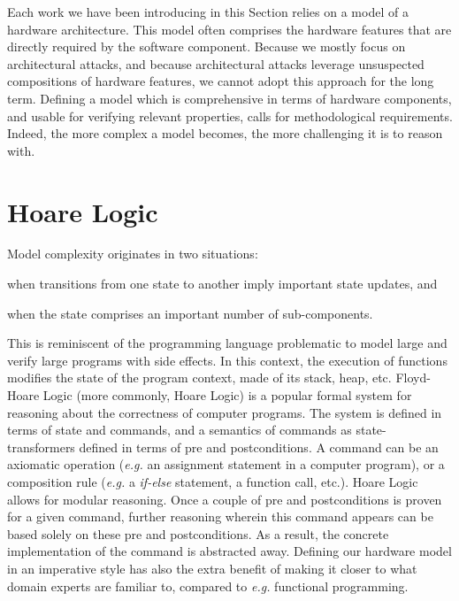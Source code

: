 Each work we have been introducing in this Section relies on a model of a
hardware architecture.
%
This model often comprises the hardware features that are directly required by
the software component.
%
Because we mostly focus on architectural attacks, and because architectural
attacks leverage unsuspected compositions of hardware features, we cannot adopt
this approach for the long term.
%
Defining a model which is comprehensive in terms of hardware components, and
usable for verifying relevant properties, calls for methodological requirements.
%
Indeed, the more complex a model becomes, the more challenging it is to reason
with.

\section{Hoare Logic} %
\label{sec:related:hoare}

Model complexity originates in two situations:
%
\begin{inparaenum}[(1)]
\item when transitions from one state to another imply important state updates,
  and
%
\item when the state comprises an important number of sub-components.
%
\end{inparaenum}
%
This is reminiscent of the programming language problematic to model large and
verify large programs with side effects.
%
In this context, the execution of functions modifies the state of the program
context, made of its stack, heap, etc.
%
Floyd-Hoare Logic (more commonly, Hoare Logic) is a popular formal system for
reasoning about the correctness of computer programs.
%
The system is defined in terms of state and commands, and a semantics of
commands as state-transformers defined in terms of pre and postconditions.
%
A command can be an axiomatic operation (\emph{e.g.} an assignment statement in
a computer program), or a composition rule (\emph{e.g.} a \emph{if-else}
statement, a function call, etc.).
%
Hoare Logic allows for modular reasoning.
%
Once a couple of pre and postconditions is proven for a given command, further
reasoning wherein this command appears can be based solely on these pre and postconditions.
%
As a result, the concrete implementation of the command is abstracted away.
%
Defining our hardware model in an imperative style has also the extra benefit of
making it closer to what domain experts are familiar to, compared to
\emph{e.g.} functional programming.


